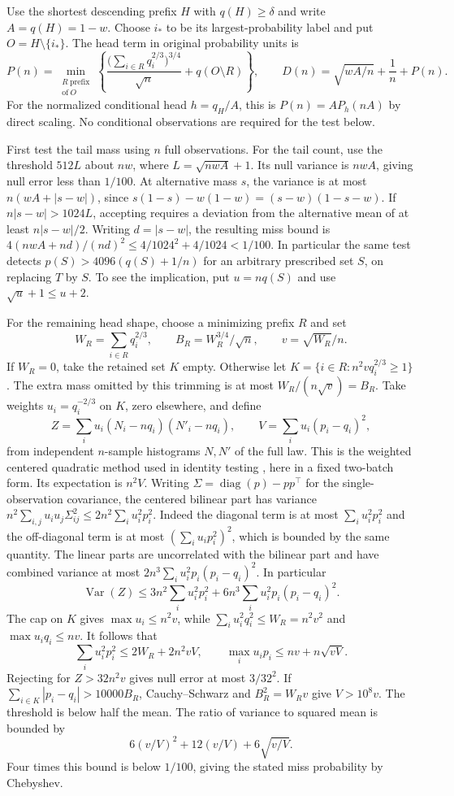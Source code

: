 Use the shortest descending prefix \(H\) with \(q(H)\ge\delta\) and write
\(A=q(H)=1-w\). Choose \(i_*\) to be its largest-probability label and put
\(O=H\setminus\{i_*\}\). The head term in original probability units is
\[
 P(n)=\min_{\substack{R\ \mathrm{prefix}\\\mathrm{of}\ O}}
  \left\{\frac{\big(\sum_{i\in R}q_i^{2/3}\big)^{3/4}}{\sqrt n}
              +q(O\setminus R)\right\},\qquad
 D(n)=\sqrt{wA/n}+\frac1n+P(n).
\]
For the normalized conditional head \(h=q_H/A\), this is
\(P(n)=A P_h(nA)\) by direct scaling. No conditional observations are
required for the test below.

First test the tail mass using \(n\) full observations. For the tail count,
use the threshold \(512L\) about \(nw\), where \(L=\sqrt{nwA}+1\).
Its null variance is \(nwA\), giving null error less than \(1/100\).
At alternative mass \(s\), the variance is at most \(n(wA+|s-w|)\),
since \(s(1-s)-w(1-w)=(s-w)(1-s-w)\).
If \(n|s-w|>1024L\), accepting requires a deviation from the alternative
mean of at least \(n|s-w|/2\). Writing \(d=|s-w|\), the resulting miss bound is
\(4(nwA+nd)/(nd)^2\le4/1024^2+4/1024<1/100\).
In particular the same test detects
\(p(S)>4096(q(S)+1/n)\) for an arbitrary prescribed set \(S\), on
replacing \(T\) by \(S\). To see the implication, put \(u=nq(S)\) and
use \(\sqrt{u}+1\le u+2\).

For the remaining head shape, choose a minimizing prefix \(R\) and set
\[
 W_R=\sum_{i\in R}q_i^{2/3},\qquad B_R=W_R^{3/4}/\sqrt n,
 \qquad v=\sqrt{W_R}/n.
\]
If \(W_R=0\), take the retained set \(K\) empty. Otherwise let
\(K=\{i\in R:n^2v q_i^{2/3}\ge1\}\). The extra mass omitted by this
trimming is at most \(W_R/(n\sqrt v)=B_R\).
Take weights \(u_i=q_i^{-2/3}\) on \(K\), zero elsewhere, and define
\[
 Z=\sum_i u_i (N_i-nq_i)(N'_i-nq_i),\qquad
 V=\sum_i u_i(p_i-q_i)^2,
\]
from independent \(n\)-sample histograms \(N,N'\) of the full law.
This is the weighted centered quadratic method used in identity
testing \cite{valiantvaliant2017,chhorcarpentier2022}, here in a fixed
two-batch form. Its expectation is \(n^2 V\). Writing
\(\Sigma=\operatorname{diag}(p)-pp^\top\) for the single-observation
covariance, the centered bilinear part has variance
\(n^2\sum_{i,j}u_i u_j\Sigma_{ij}^2\le2n^2\sum_i u_i^2p_i^2\).
Indeed the diagonal term is at most \(\sum_i u_i^2p_i^2\) and the
off-diagonal term is at most \((\sum_i u_i p_i^2)^2\), which is bounded
by the same quantity. The linear parts are uncorrelated with the
bilinear part and have combined variance at most
\(2n^3\sum_i u_i^2p_i(p_i-q_i)^2\). In particular
\[
 \operatorname{Var}(Z)
 \le 3n^2\sum_i u_i^2p_i^2+
       6n^3\sum_i u_i^2p_i(p_i-q_i)^2.
\]
The cap on \(K\) gives \(\max u_i\le n^2v\), while
\(\sum_i u_i^2q_i^2\le W_R=n^2v^2\) and \(\max u_iq_i\le nv\).
It follows that
\[
 \sum_i u_i^2p_i^2\le2W_R+2n^2vV,\qquad
 \max_i u_i p_i\le n v+n\sqrt{vV}.
\]
Rejecting for \(Z>32n^2v\) gives null error at most \(3/32^2\).
If \(\sum_{i\in K}|p_i-q_i|>10000B_R\), Cauchy--Schwarz and
\(B_R^2=W_Rv\) give \(V>10^8v\). The threshold is below half the
mean. The ratio of variance to squared mean is bounded by
\[
 6(v/V)^2+12(v/V)+6\sqrt{v/V}.
\]
Four times this bound is below \(1/100\), giving the stated miss
probability by Chebyshev.

